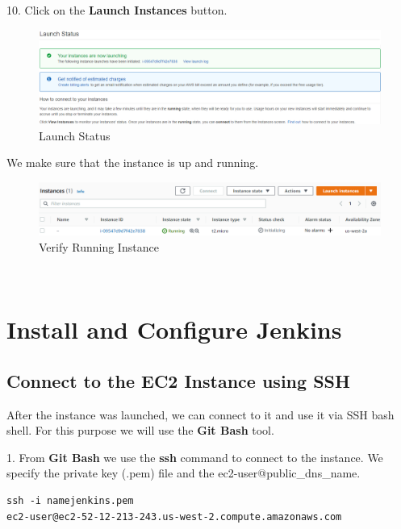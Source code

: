 \documentclass[12pt,a4paper,twoside]{article}
\begin{document}
10. Click on the \textbf{Launch Instances} button.


\begin{figure}[H]
    \centering
        \includegraphics[width=15cm]{images-aws/11-launch-status.png}
        \caption{Launch Status}
\end{figure}


We make sure that the instance is up and running.


\begin{figure}[H]
    \centering
        \includegraphics[width=15cm]{images-aws/12-running-instance.png}
        \caption{Verify Running Instance}
\end{figure}



~\newpage


\section{Install and Configure Jenkins}


\subsection{Connect to the EC2 Instance using SSH}


After the instance was launched, we can connect to it and use it via SSH bash shell. For this purpose we will use the \textbf{Git Bash} tool.


1. From \textbf{Git Bash} we use the \textbf{ssh} command to connect to the instance. We specify the private key (.pem) file and the ec2-user@public\_dns\_name.

\begin{verbatim}
ssh -i namejenkins.pem 
ec2-user@ec2-52-12-213-243.us-west-2.compute.amazonaws.com
\end{verbatim}
\end{document}
